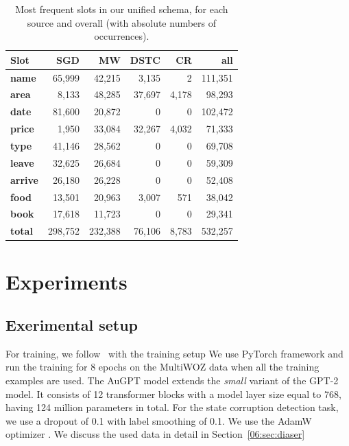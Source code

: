 \begin{table}[tp]
    \centering\footnotesize
    \begin{tabular}{l>{\hspace{-2mm}}rrrrr}
        \toprule
        \bf Slot &
        \textbf{SGD} & 
        \textbf{MW} &
        \textbf{DSTC} &
        \textbf{CR} &
         \textbf{all}\\ \midrule
        \textbf{name} & 65,999 & 42,215 & 3,135 & 2 & 111,351\\ 
        \textbf{area} & 8,133 & 48,285 & 37,697 & 4,178 & 98,293 \\ 
        \textbf{date} & 81,600 & 20,872 & 0 & 0 & 102,472\\
        \textbf{price} & 1,950 & 33,084 & 32,267 & 4,032 & 71,333\\
        \textbf{type}& 41,146 & 28,562 & 0 & 0 & 69,708\\
        \textbf{leave}& 32,625 & 26,684 & 0 & 0 & 59,309\\
        \textbf{arrive}& 26,180 & 26,228 & 0 & 0 & 52,408\\
        \textbf{food}& 13,501 & 20,963 & 3,007 & 571 & 38,042\\
        \textbf{book}& 17,618 & 11,723 & 0 & 0 & 29,341\\
        \midrule
        \textbf{total}& 298,752 & 232,388 & 76,106 & 8,783 & 532,257\\
        \bottomrule
    \end{tabular}
    \caption{Most frequent slots in our unified schema, for each source and overall (with absolute numbers of occurrences).}
    \label{tab:slots}
\end{table}

\section{Experiments}
\subsection{Exerimental setup}
For training, we follow~\citep{kulhanek-etal-2021-augpt} with the training setup
We use PyTorch framework \cite{pytorch} and run the training for 8 epochs on the MultiWOZ data when all the training examples are used.
The AuGPT model extends the \emph{small} variant of the GPT-2 model.
It consists of 12 transformer blocks with a model layer size equal to 768, having 124 million parameters in total.
For the state corruption detection task, we use a dropout of 0.1 with label smoothing of 0.1.
We use the AdamW optimizer \cite{DBLP:conf/iclr/LoshchilovH19}.
We discuss the used data in detail in Section~\ref{06:sec:diaser}
